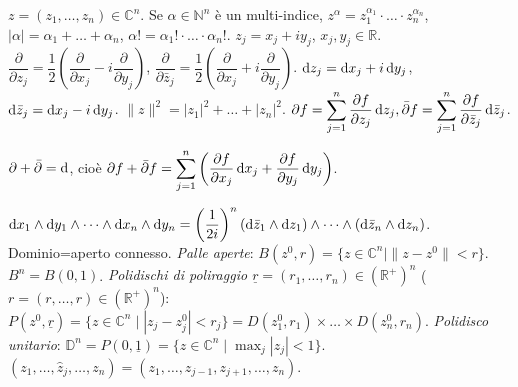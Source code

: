 $z=(z_1, \dots, z_n) \in \mathbb{C}^n$. Se $\alpha \in \mathbb{N}^n$ è un multi-indice, $z^{\alpha}=z_1^{\alpha_1}\cdot \ldots \cdot z_n^{\alpha_n}$, $|\alpha|=\alpha_1+\dots+\alpha_n$, $\alpha!=\alpha_1!\cdot\ldots\cdot\alpha_n!$.
$z_j=x_j+iy_j$, $x_j,y_j \in \mathbb{R}$. $\dfrac{\partial}{\partial z_j}=\dfrac{1}{2}\left(\dfrac{\partial}{\partial x_j}-i\dfrac{\partial}{\partial y_j}\right)$, $\dfrac{\partial}{\partial\bar{z}_j}=\dfrac{1}{2}\left(\dfrac{\partial}{\partial x_j}+i\dfrac{\partial}{\partial y_j}\right)$.
$\mathop{}\!\mathrm{d} z_j=\mathop{}\!\mathrm{d} x_j+i\mathop{}\!\mathrm{d} y_j$, $\mathop{}\!\mathrm{d}\bar{z}_j=\mathop{}\!\mathrm{d} x_j-i\mathop{}\!\mathrm{d} y_j$. $\|z\|^2=|z_1|^2+\dots+|z_n|^2$. $\displaystyle \partial f=\sum_{j=1}^n \dfrac{\partial f}{\partial z_j}\mathop{}\!\mathrm{d} z_j, \bar{\partial} f=\sum_{j=1}^n \dfrac{\partial f}{\partial \bar{z}_j}\mathop{}\!\mathrm{d} \bar{z}_j$.

\begin{exc}
  $\partial+\bar{\partial}=\mathop{}\!\mathrm{d}$, cioè $\displaystyle \partial f+\bar{\partial}f=\sum_{j=1}^n \left(\dfrac{\partial f}{\partial x_j}\mathop{}\!\mathrm{d} x_j+\dfrac{\partial f}{\partial y_j}\mathop{}\!\mathrm{d} y_j\right)$.
\end{exc}

$\diff x_1 \wedge \diff y_1 \wedge \dots \wedge \diff x_n \wedge \diff y_n=\left(\dfrac{1}{2i}\right)^n(\diff\bar{z}_1\wedge \diff z_1)\wedge \dots \wedge (\diff\bar{z}_n \wedge \diff z_n)$.
Dominio=aperto connesso. \textit{Palle aperte}: $B(z^0, r)=\{z \in \mathbb{C}^n \mid \|z-z^0\|<r\}$. $B^n=B(0,1)$.
\textit{Polidischi di poliraggio $\underline{r}=(r_1,\dots,r_n) \in (\mathbb{R}^+)^n$} ($r=(r, \dots, r) \in (\mathbb{R}^+)^n$): $P(z^0, \underline{r})=\{z \in \mathbb{C}^n \mid |z_j-z_j^0|<r_j\}=D(z_1^0, r_1) \times \dots \times D(z_n^0, r_n)$.
\textit{Polidisco unitario}: $\displaystyle \mathbb{D}^n=P(0, \underline{1})=\{z \in \mathbb{C}^n \mid \max_j |z_j|<1\}$. $(z_1, \dots, \hat{z}_j,\dots, z_n)=(z_1, \dots, z_{j-1}, z_{j+1}, \dots, z_n)$.

